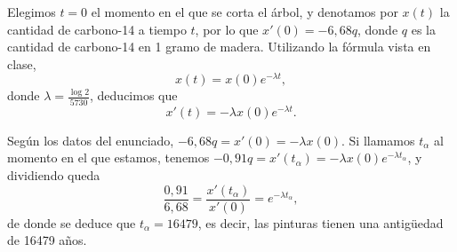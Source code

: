 \documentclass[../ecuaciones_diferenciales.tex]{subfiles}
\begin{document}
\begin{solution}
	Elegimos \(t = 0\) el momento en el que se corta el árbol, y denotamos por
	\(x(t)\) la cantidad de carbono-14 a tiempo \(t\), por lo que
	\(x'(0) = -6,68 q\), donde \(q\) es la cantidad de carbono-14 en 1 gramo de
	madera.  Utilizando la fórmula vista en clase,
	\[x(t) = x(0) e^{-\lambda t},\]
	donde \(\lambda = \frac{\log 2}{5730}\), deducimos que
	\[x'(t) = -\lambda x(0) e^{-\lambda t}.\]

	Según los datos del enunciado, \(-6,68 q = x'(0) = -\lambda x(0)\). Si
	llamamos \(t_\alpha\) al momento en el que estamos, tenemos
	\(-0,91 q = x'(t_\alpha) = - \lambda x(0) e^{-\lambda t_\alpha}\), y
	dividiendo queda
	\[\frac{0,91}{6,68} = \frac{x'(t_\alpha)}{x'(0)} = e^{-\lambda t_\alpha},\]
	de donde se deduce que \(t_\alpha = 16479\), es decir, las pinturas tienen una
	antigüedad de 16479 años.
\end{solution}
\end{document}
